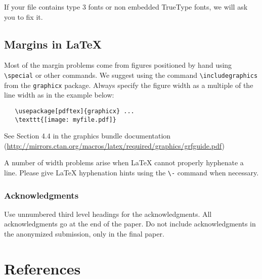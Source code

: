 \documentclass[final]{article}
\begin{document}
\begin{itemize}
\begin{itemize}
\end{itemize}

If your file contains type 3 fonts or non embedded TrueType fonts, we
will ask you to fix it.

\subsection{Margins in \LaTeX{}}

Most of the margin problems come from figures positioned by hand using
\verb+\special+ or other commands. We suggest using the command
\verb+\includegraphics+ from the \verb+graphicx+ package. Always
specify the figure width as a multiple of the line width as in the
example below:
\begin{verbatim}
   \usepackage[pdftex]{graphicx} ...
   \texttt{[image: myfile.pdf]}
\end{verbatim}
See Section 4.4 in the graphics bundle documentation
(\url{http://mirrors.ctan.org/macros/latex/required/graphics/grfguide.pdf})

A number of width problems arise when \LaTeX{} cannot properly
hyphenate a line. Please give LaTeX hyphenation hints using the
\verb+\-+ command when necessary.

\subsubsection*{Acknowledgments}

Use unnumbered third level headings for the acknowledgments. All
acknowledgments go at the end of the paper. Do not include
acknowledgments in the anonymized submission, only in the final paper.

\section*{References}



\end{document}
